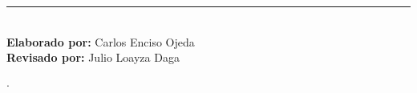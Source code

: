 \begin{titlepage}
\vspace{1cm}
\par
\noindent
\Huge
{\raggedright
{}
\textbf{\thesisTitle}\par}
\vspace{0.2cm}
\LARGE
\par
\noindent
\\
\thesisSubTitle\\
\rule[0.3cm]{\linewidth}{2pt}
\Large

\noindent
\thesisTitleTranslated

\vspace{2cm}
\noindent
\LARGE
\thesisAuthor\\

\vspace{1cm}
\noindent
\large
\textbf{Elaborado por:} Carlos Enciso Ojeda\\
\noindent
\textbf{Revisado por:} Julio Loayza Daga\\

\vspace{0.5cm}
\small
\noindent
\begin{minipage}{\linewidth}
\raggedright
\thesisDegree $\cdot$ \credits\\
\university\\
\thesisPlaceDate
\end{minipage}

\end{titlepage}
